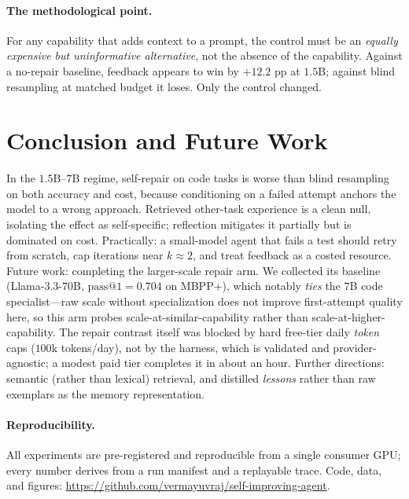 \documentclass{article}
\makeatletter
\newcommand{\pass}{\mathrm{pass}@1}
\makeatother
\begin{document}
\paragraph{The methodological point.}
For any capability that adds context to a prompt, the control must be an
\emph{equally expensive but uninformative alternative}, not the absence of the
capability. Against a no-repair baseline, feedback appears to win by $+12.2$ pp
at $1.5$B; against blind resampling at matched budget it loses. Only the
control changed.

\section{Conclusion and Future Work}
\label{sec:conclusion}

In the $1.5$B--$7$B regime, self-repair on code tasks is worse than blind
resampling on both accuracy and cost, because conditioning on a failed attempt
anchors the model to a wrong approach. Retrieved other-task experience is a
clean null, isolating the effect as self-specific; reflection mitigates it
partially but is dominated on cost. Practically: a small-model agent that fails
a test should retry from scratch, cap iterations near $k{\approx}2$, and treat
feedback as a costed resource. Future work: completing the larger-scale
repair arm. We collected its baseline (Llama-3.3-70B, $\pass{=}0.704$ on
MBPP+), which notably \emph{ties} the $7$B code specialist---raw scale without
specialization does not improve first-attempt quality here, so this arm
probes scale-at-similar-capability rather than scale-at-higher-capability.
The repair contrast itself was blocked by hard free-tier daily \emph{token}
caps ($100$k tokens/day), not by the harness, which is validated and
provider-agnostic; a modest paid tier completes it in about an hour. Further
directions: semantic (rather than lexical) retrieval, and distilled
\emph{lessons} rather than raw exemplars as the memory representation.

\paragraph{Reproducibility.}
All experiments are pre-registered and reproducible from a single consumer GPU;
every number derives from a run manifest and a replayable trace. Code, data,
and figures: \url{https://github.com/vermayuvraj/self-improving-agent}.


\end{document}
